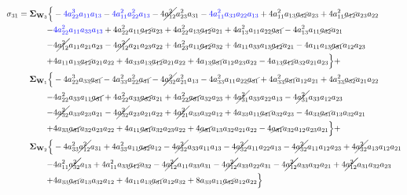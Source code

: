 \documentclass{article}
\begin{document}
\begin{equation}
\begin{aligned}
\sigma_{31} =  \mathbf{\Sigma}_{\textbf{W}_{3}} \Bigl\{ & -\textcolor{blue}{4 a_{22}^{3} a_{11} a_{13}} - \textcolor{blue}{4 a_{11}^{2} a_{22}^{2} a_{13}} - 4 \cancel{a_{12}^{2}} a_{23}^{2} a_{31} - \textcolor{blue}{4 a_{11}^{2} a_{33} a_{22} a_{13}} + 4 a_{11}^{2} a_{13} \cancel{a_{32}} a_{23} + 4 a_{11}^{2} \cancel{a_{12}} a_{23} a_{22} \\
-& \textcolor{blue}{4 a_{22}^{2} a_{11} a_{33} a_{13}} + 4 a_{22}^{2} a_{11} \cancel{a_{12}} a_{23} + 4 a_{22}^{2} a_{13} \cancel{a_{12}} a_{21} + 4 a_{13}^{2} a_{11} a_{22} \cancel{a_{31}} - 4a_{13}^{2} a_{11} \cancel{a_{32}} a_{21} \\
-& 4 \cancel{a_{12}^{2}} a_{11} a_{21} a_{23} - 4 \cancel{a_{12}^{2}} a_{21} a_{23} a_{22} + 4 a_{23}^{2} a_{11} \cancel{a_{12}} a_{32} + 4 a_{11} a_{33} a_{13} \cancel{a_{12}} a_{21} - 4 a_{11} a_{13}\cancel{a_{31}} a_{12} a_{23} \\
+& 4 a_{11} a_{13} \cancel{a_{12}} a_{21} a_{22} + 4 a_{33} a_{13} \cancel{a_{12}} a_{21} a_{22} + 4 a_{13} \cancel{a_{31}} a_{12} a_{23} a_{22} - 4 a_{13} \cancel{a_{12}} a_{32} a_{21} a_{23}\Bigr\} + \\
\mathbf{\Sigma}_{\textbf{W}_{1}} \Bigl\{& -4 a_{22}^{3} a_{33} \cancel{a_{31}} - 4 a_{33}^{2} a_{22}^{2} \cancel{a_{31}} - 4 \cancel{a_{32}^{2}} a_{21}^{2} a_{13} - 4 a_{33}^{2} a_{11} a_{22} \cancel{a_{31}} + 4 a_{33}^{2} \cancel{a_{31}} a_{12} a_{21} + 4 a_{33}^{2} \cancel{a_{32}} a_{21} a_{22} \\
-& 4 a_{22}^{2} a_{33} a_{11} \cancel{a_{31}} + 4 a_{22}^{2} a_{33} \cancel{a_{32}} a_{21} + 4 a_{22}^{2} \cancel{a_{31}} a_{32} a_{23} + 4 \cancel{a_{31}^{2}} a_{33} a_{22} a_{13} - 4 \cancel{a_{31}^{2}} a_{33} a_{12} a_{23} \\
-& 4 \cancel{a_{32}^{2}} a_{33} a_{23} a_{21} - 4 \cancel{a_{32}^{2}} a_{23} a_{21} a_{22} + 4 \cancel{a_{21}^{2}} a_{33} a_{32} a_{12} + 4 a_{33} a_{11} \cancel{a_{31}} a_{32} a_{23} - 4 a_{33} \cancel{a_{31}} a_{13} a_{32} a_{21} \\
+& 4 a_{33} \cancel{a_{31}} a_{32} a_{23} a_{22} + 4 a_{11} \cancel{a_{31}} a_{32} a_{23} a_{22} + 4 \cancel{a_{31}} a_{13} a_{32} a_{21} a_{22} - 4 \cancel{a_{31}} a_{32} a_{12} a_{23} a_{21}\Bigr\} + \\
\mathbf{\Sigma}_{\textbf{W}_{2}} \Bigl\{& -4a_{33}^{2} \cancel{a_{12}^{2}} a_{31} + 4 a_{33}^{2} a_{11} \cancel{a_{32}} a_{12} - 4 \cancel{a_{32}^{2}} a_{33} a_{11} a_{13} - 4 \cancel{a_{32}^{2}} a_{11} a_{22} a_{13} - 4 \cancel{a_{32}^{2}} a_{11} a_{12} a_{23} + 4 \cancel{a_{32}^{2}} a_{13} a_{12} a_{21} \\
-& 4 a_{11}^{2} \cancel{a_{32}^{2}} a_{13} + 4 a_{11}^{2} a_{33} \cancel{a_{12}} a_{32} - 4 \cancel{a_{12}^{2}} a_{11} a_{33} a_{31} - 4 \cancel{a_{12}^{2}} a_{33} a_{22} a_{31} - 4 \cancel{a_{12}^{2}} a_{33} a_{32} a_{21} + 4 \cancel{a_{12}^{2}} a_{31} a_{32} a_{23} \\
+& 4 a_{33} \cancel{a_{31}} a_{13} a_{32} a_{12} + 4 a_{11} a_{13} \cancel{a_{31}} a_{12} a_{32} + 8 a_{33} a_{11} \cancel{a_{32}} a_{12} a_{22}\Bigr\}
\end{aligned}
\end{equation}
\end{document}
